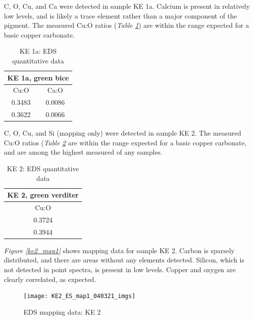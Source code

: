 
C, O, Cu, and Ca were detected in sample KE 1a. Calcium is present in relatively low levels, and is likely a trace element rather than a major component of the pigment. The measured Cu:O ratios (\textit{Table \ref{table:ke1a_ratios}}) are within the range expected for a basic copper carbonate.

\begin{table}[H]
\caption{KE 1a: EDS quantitative data}
\centering
\label{table:ke1a_ratios}
\begin{tabular}{c c}
\toprule
\multicolumn{2}{c}{KE 1a, green bice} \\
\midrule
Cu:O & Ca:O \\
\midrule
0.3483 & 0.0086 \\
0.3622 & 0.0066 \\
\bottomrule
\end{tabular}
\end{table}


C, O, Cu, and Si (mapping only) were detected in sample KE 2. The measured Cu:O ratios (\textit{Table \ref{table:ke2_ratios}} are within the range expected for a basic copper carbonate, and are among the highest measured of any samples.

\begin{table}[H]
\caption{KE 2: EDS quantitative data}
\centering
\label{table:ke2_ratios}
\begin{tabular}{c}
\toprule
KE 2, green verditer \\
\midrule
Cu:O \\
\midrule
0.3724 \\
0.3944 \\
\bottomrule
\end{tabular}
\end{table}

\textit{Figure \ref{ke2_map1}} shows mapping data for sample KE 2. Carbon is sparsely distributed, and there are areas without any elements detected. Silicon, which is not detected in point spectra, is present in low levels. Copper and oxygen are clearly correlated, as expected.

\begin{figure}[H]
\centering
  \texttt{[image: KE2\_ES\_map1\_040321\_imgs]}
\caption[EDS mapping data: KE 2]{EDS mapping data: KE 2}
\label{fig:ke2_map1}
\end{figure}


